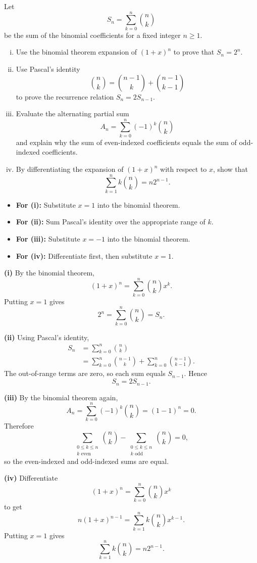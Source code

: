 \begin{problem}
Let
\[
S_n=\sum_{k=0}^n \binom{n}{k}
\]
be the sum of the binomial coefficients for a fixed integer $n\ge1$.

\begin{enumerate}[(i)]
\item Use the binomial theorem expansion of $(1+x)^n$ to prove that $S_n=2^n$.
\item Use Pascal's identity
\[
\binom{n}{k}=\binom{n-1}{k}+\binom{n-1}{k-1}
\]
to prove the recurrence relation $S_n=2S_{n-1}$.
\item Evaluate the alternating partial sum
\[
A_n=\sum_{k=0}^n (-1)^k\binom{n}{k}
\]
and explain why the sum of even-indexed coefficients equals the sum of odd-indexed coefficients.
\item By differentiating the expansion of $(1+x)^n$ with respect to $x$, show that
\[
\sum_{k=1}^n k\binom{n}{k}=n2^{n-1}.
\]
\end{enumerate}
\end{problem}
\begin{hint}
\begin{itemize}
\item \textbf{For (i):} Substitute $x=1$ into the binomial theorem.
\item \textbf{For (ii):} Sum Pascal's identity over the appropriate range of $k$.
\item \textbf{For (iii):} Substitute $x=-1$ into the binomial theorem.
\item \textbf{For (iv):} Differentiate first, then substitute $x=1$.
\end{itemize}
\end{hint}
\begin{solution}
\textbf{(i)} By the binomial theorem,
\[
(1+x)^n=\sum_{k=0}^n \binom{n}{k}x^k.
\]
Putting $x=1$ gives
\[
2^n=\sum_{k=0}^n \binom{n}{k}=S_n.
\]

\textbf{(ii)} Using Pascal's identity,
\[
\begin{aligned}
S_n
&=\sum_{k=0}^n\binom{n}{k}\\
&=\sum_{k=0}^n\binom{n-1}{k}+\sum_{k=0}^n\binom{n-1}{k-1}.
\end{aligned}
\]
The out-of-range terms are zero, so each sum equals $S_{n-1}$. Hence
\[
S_n=2S_{n-1}.
\]

\textbf{(iii)} By the binomial theorem again,
\[
A_n=\sum_{k=0}^n(-1)^k\binom{n}{k}=(1-1)^n=0.
\]
Therefore
\[
\sum_{\substack{0\le k\le n\\ k\text{ even}}}\binom{n}{k}
-
\sum_{\substack{0\le k\le n\\ k\text{ odd}}}\binom{n}{k}
=0,
\]
so the even-indexed and odd-indexed sums are equal.

\textbf{(iv)} Differentiate
\[
(1+x)^n=\sum_{k=0}^n\binom{n}{k}x^k
\]
to get
\[
n(1+x)^{n-1}=\sum_{k=1}^n k\binom{n}{k}x^{k-1}.
\]
Putting $x=1$ gives
\[
\sum_{k=1}^n k\binom{n}{k}=n2^{n-1}.
\]
\end{solution}
